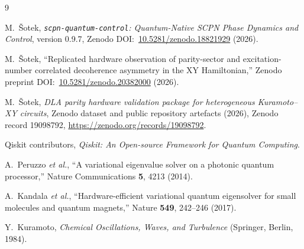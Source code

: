 \documentclass[preprint,aps,physrev,superscriptaddress,floatfix,longbibliography]{revtex4-2}
\begin{document}
\begin{thebibliography}{9}

M.~\v{S}otek,
\emph{\texttt{scpn-quantum-control}: Quantum-Native SCPN Phase Dynamics
and Control}, version 0.9.7,
Zenodo DOI:~\href{https://doi.org/10.5281/zenodo.18821929}{10.5281/zenodo.18821929} (2026).

M.~\v{S}otek,
``Replicated hardware observation of parity-sector and excitation-number
correlated decoherence asymmetry in the XY Hamiltonian,''
Zenodo preprint DOI:~\href{https://doi.org/10.5281/zenodo.20382000}{10.5281/zenodo.20382000} (2026).

M.~\v{S}otek,
\emph{DLA parity hardware validation package for heterogeneous
Kuramoto--XY circuits},
Zenodo dataset and public repository artefacts (2026),
Zenodo record 19098792, \url{https://zenodo.org/records/19098792}.

Qiskit contributors,
\emph{Qiskit: An Open-source Framework for Quantum Computing}.

A.~Peruzzo \emph{et al.},
``A variational eigenvalue solver on a photonic quantum processor,''
Nature Communications \textbf{5}, 4213 (2014).

A.~Kandala \emph{et al.},
``Hardware-efficient variational quantum eigensolver for small molecules
and quantum magnets,''
Nature \textbf{549}, 242--246 (2017).

Y.~Kuramoto,
\emph{Chemical Oscillations, Waves, and Turbulence}
(Springer, Berlin, 1984).

\end{thebibliography}
\end{document}
